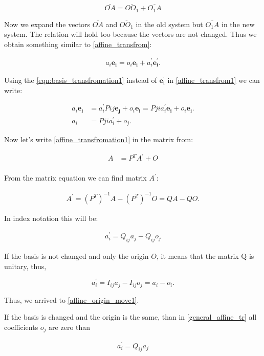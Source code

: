 \documentclass{book}
\begin{document}
\[\overline{OA} = \overline{OO_1} + \overline{O_1A}\]

Now we expand the vectors $\overline{OA}$ and $\overline{OO_1}$ in the old system but $\overline{O_1A}$ in the new system. The relation will hold too because the vectors are not changed. Thus we obtain something similar to \eqref{affine_transfrom}:

\begin{align}
a_i\boldsymbol{e_i} = o_i\boldsymbol{e_i} + a^{'}_i\boldsymbol{e^{'}_i} \label{affine_transfrom1}.
\end{align}


Using the \eqref{eqn:basis_transfromation1} instead of $\boldsymbol{e^{'}_i}$ in \eqref{affine_transfrom1} we can write:

\begin{align}
a_i\boldsymbol{e_i} &= a^{'}_{i}P{ij}\boldsymbol{e_j} + o_i\boldsymbol{e_i} = P{ji}a^{'}_{i}\boldsymbol{e_i} + o_i\boldsymbol{e_i} \label{affine_transfrom2}.\\
a_i &= Pjia^{'}_i + o_j. \label{affine_transfromation1}
\end{align}

Now let's write \eqref{affine_transfromation1} in the matrix from:

\begin{align}
A &= P^{T}A^{'} + O \\
\end{align}

From the matrix equation we can find matrix $A^'$:

\begin{align*}
A^{'} = (P^T)^{-1}A - (P^T)^{-1}O = QA - QO.
\end{align*}

In index notation this will be:

\begin{align}
a^{'}_i = Q_{ij}a_j - Q_{ij}o_j \label{general_affine_tr}
\end{align}

If the basis is not changed and only the origin $O$, it means that the matrix Q is unitary, thus,

\[a^{'}_i = I_{ij}a_j - I_{ij}o_j = a_i - o_i.\]

Thus, we arrived to \eqref{affine_origin_move1}.

If the basis is changed and the origin is the same, than in \eqref{general_affine_tr} all coefficients $o_j$ are zero than

\begin{align}
a^{'}_i = Q_{ij}a_j \label{affine_transform_without_origin}
\end{align}
\end{document}

